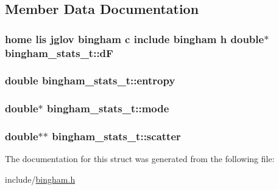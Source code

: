 \subsection{Member Data Documentation}
\hypertarget{structbingham__stats__t_a775fe067372b415f1e6fad5aa51bb281}{
\subsubsection[{dF}]{\setlength{\rightskip}{0pt plus 5cm}home lis jglov bingham c include bingham h double$\ast$ {\bf bingham\_\-stats\_\-t::dF}}}
\label{structbingham__stats__t_a775fe067372b415f1e6fad5aa51bb281}
\hypertarget{structbingham__stats__t_afdc3030b09ffb757f81a9825514249bd}{
\subsubsection[{entropy}]{\setlength{\rightskip}{0pt plus 5cm}double {\bf bingham\_\-stats\_\-t::entropy}}}
\label{structbingham__stats__t_afdc3030b09ffb757f81a9825514249bd}
\hypertarget{structbingham__stats__t_ac1de1886b042fbb1fa558939df04de2d}{
\subsubsection[{mode}]{\setlength{\rightskip}{0pt plus 5cm}double$\ast$ {\bf bingham\_\-stats\_\-t::mode}}}
\label{structbingham__stats__t_ac1de1886b042fbb1fa558939df04de2d}
\hypertarget{structbingham__stats__t_ae9f1d2fe10755050f0b6e14cafd3f598}{
\subsubsection[{scatter}]{\setlength{\rightskip}{0pt plus 5cm}double$\ast$$\ast$ {\bf bingham\_\-stats\_\-t::scatter}}}
\label{structbingham__stats__t_ae9f1d2fe10755050f0b6e14cafd3f598}


The documentation for this struct was generated from the following file:\begin{DoxyCompactItemize}
\item 
include/\hyperlink{bingham_8h}{bingham.h}\end{DoxyCompactItemize}
